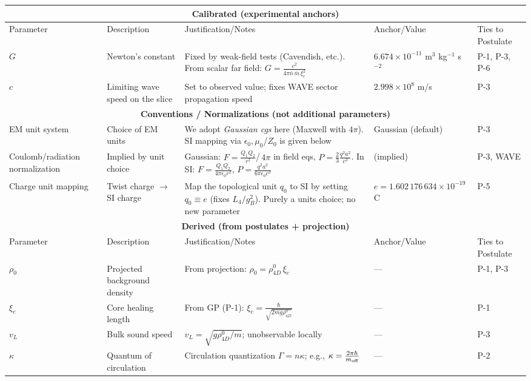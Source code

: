 \begin{table}[H]
\centering
\small
\begin{tabularx}{\linewidth}{|p{1.7cm}|p{3.2cm}|X|p{2.4cm}|p{2.1cm}|}
\hline
\multicolumn{5}{|c|}{\textbf{Calibrated (experimental anchors)}} \\
\hline
Parameter & Description & Justification/Notes & Anchor/Value & Ties to Postulate \\
\hline
$G$ & Newton's constant & Fixed by weak-field tests (Cavendish, etc.). From scalar far field: $G=\frac{c^2}{4\pi\bar n\,\bar m\,\xi_c^2}$ & $6.674\times10^{-11}$ m$^3$ kg$^{-1}$ s$^{-2}$ & P-1, P-3, P-6 \\
\hline
$c$ & Limiting wave speed on the slice & Set to observed value; fixes WAVE sector propagation speed & $2.998\times10^{8}$ m/s & P-3 \\
\hline
\multicolumn{5}{|c|}{\textbf{Conventions / Normalizations (not additional parameters)}} \\
\hline
EM unit system & Choice of EM units & We adopt \emph{Gaussian cgs} here (Maxwell with $4\pi$). SI mapping via $\epsilon_0,\mu_0$/$Z_0$ is given below & Gaussian (default) & P-3 \\
\hline
Coulomb/radiation normalization & Implied by unit choice & Gaussian: $F=\frac{Q_1Q_2}{r^2}$/$\,4\pi$ in field eqs, $P=\tfrac{2}{3}\frac{q^2 a^2}{c^3}$. In SI: $F=\frac{Q_1Q_2}{4\pi\epsilon_0 r^2}$, $P=\frac{q^2 a^2}{6\pi\epsilon_0 c^3}$ & (implied) & P-3, WAVE \\
\hline
Charge unit mapping & Twist charge $\to$ SI charge & Map the topological unit $q_0$ to SI by setting $q_0\equiv e$ (fixes $L_4/g_B^2$). Purely a units choice; no new parameter & $e=1.602\,176\,634\times10^{-19}$ C & P-5 \\
\hline
\multicolumn{5}{|c|}{\textbf{Derived (from postulates + projection)}} \\
\hline
Parameter & Description & Justification/Notes & Anchor/Value & Ties to Postulate \\
\hline
$\rho_0$ & Projected background density & From projection: $\rho_0=\rho_{4D}^0\,\xi_c$ & --- & P-1, P-3 \\
\hline
$\xi_c$ & Core healing length & From GP (P-1): $\xi_c=\frac{\hbar}{\sqrt{2mg\rho_{4D}^0}}$ & --- & P-1 \\
\hline
$v_L$ & Bulk sound speed & $v_L=\sqrt{g\rho_{4D}^0/m}$; unobservable locally & --- & P-3 \\
\hline
$\kappa$ & Quantum of circulation & Circulation quantization $\Gamma=n\kappa$; e.g., $\kappa=\frac{2\pi\hbar}{m_{\rm eff}}$ & --- & P-2 \\

\end{tabularx}
\end{table}
